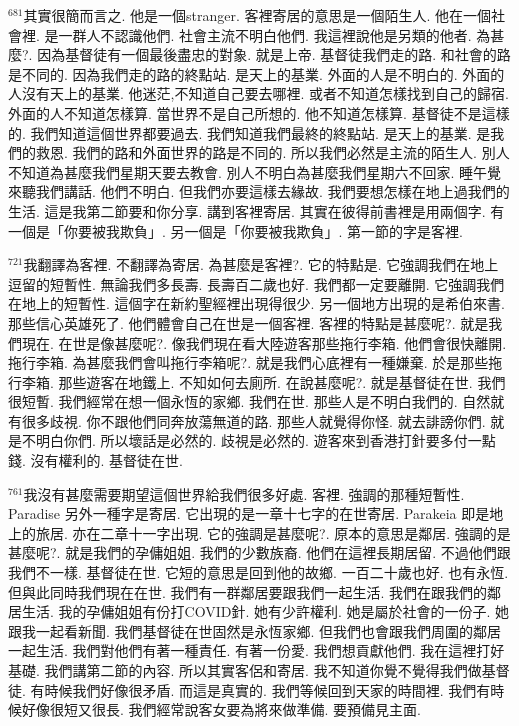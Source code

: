 \documentclass{book}
\begin{document}
$^{681}$其實很簡而言之.
他是一個stranger.
客裡寄居的意思是一個陌生人.
他在一個社會裡.
是一群人不認識他們.
社會主流不明白他們.
我這裡說他是另類的他者.
為甚麼?.
因為基督徒有一個最後盡忠的對象.
就是上帝.
基督徒我們走的路.
和社會的路是不同的.
因為我們走的路的終點站.
是天上的基業.
外面的人是不明白的.
外面的人沒有天上的基業.
他迷茫,不知道自己要去哪裡.
或者不知道怎樣找到自己的歸宿.
外面的人不知道怎樣算.
當世界不是自己所想的.
他不知道怎樣算.
基督徒不是這樣的.
我們知道這個世界都要過去.
我們知道我們最終的終點站.
是天上的基業.
是我們的救恩.
我們的路和外面世界的路是不同的.
所以我們必然是主流的陌生人.
別人不知道為甚麼我們星期天要去教會.
別人不明白為甚麼我們星期六不回家.
睡午覺來聽我們講話.
他們不明白.
但我們亦要這樣去緣故.
我們要想怎樣在地上過我們的生活.
這是我第二節要和你分享.
講到客裡寄居.
其實在彼得前書裡是用兩個字.
有一個是「你要被我欺負」.
另一個是「你要被我欺負」.
第一節的字是客裡.

$^{721}$我翻譯為客裡.
不翻譯為寄居.
為甚麼是客裡?.
它的特點是.
它強調我們在地上逗留的短暫性.
無論我們多長壽.
長壽百二歲也好.
我們都一定要離開.
它強調我們在地上的短暫性.
這個字在新約聖經裡出現得很少.
另一個地方出現的是希伯來書.
那些信心英雄死了.
他們體會自己在世是一個客裡.
客裡的特點是甚麼呢?.
就是我們現在.
在世是像甚麼呢?.
像我們現在看大陸遊客那些拖行李箱.
他們會很快離開.
拖行李箱.
為甚麼我們會叫拖行李箱呢?.
就是我們心底裡有一種嫌棄.
於是那些拖行李箱.
那些遊客在地鐵上.
不知如何去廁所.
在說甚麼呢?.
就是基督徒在世.
我們很短暫.
我們經常在想一個永恆的家鄉.
我們在世.
那些人是不明白我們的.
自然就有很多歧視.
你不跟他們同奔放蕩無道的路.
那些人就覺得你怪.
就去誹謗你們.
就是不明白你們.
所以壞話是必然的.
歧視是必然的.
遊客來到香港打針要多付一點錢.
沒有權利的.
基督徒在世.

$^{761}$我沒有甚麼需要期望這個世界給我們很多好處.
客裡.
強調的那種短暫性.
Paradise 另外一種字是寄居.
它出現的是一章十七字的在世寄居.
Parakeia 即是地上的旅居.
亦在二章十一字出現.
它的強調是甚麼呢?.
原本的意思是鄰居.
強調的是甚麼呢?.
就是我們的孕傭姐姐.
我們的少數族裔.
他們在這裡長期居留.
不過他們跟我們不一樣.
基督徒在世.
它短的意思是回到他的故鄉.
一百二十歲也好.
也有永恆.
但與此同時我們現在在世.
我們有一群鄰居要跟我們一起生活.
我們在跟我們的鄰居生活.
我的孕傭姐姐有份打COVID針.
她有少許權利.
她是屬於社會的一份子.
她跟我一起看新聞.
我們基督徒在世固然是永恆家鄉.
但我們也會跟我們周圍的鄰居一起生活.
我們對他們有著一種責任.
有著一份愛.
我們想貢獻他們.
我在這裡打好基礎.
我們講第二節的內容.
所以其實客侶和寄居.
我不知道你覺不覺得我們做基督徒.
有時候我們好像很矛盾.
而這是真實的.
我們等候回到天家的時間裡.
我們有時候好像很短又很長.
我們經常說客女要為將來做準備.
要預備見主面.
\end{document}
